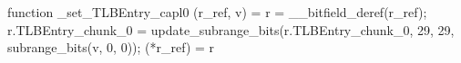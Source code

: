 function _set_TLBEntry_capl0 (r_ref, v) = {
    r = __bitfield_deref(r_ref);
    r.TLBEntry_chunk_0 = update_subrange_bits(r.TLBEntry_chunk_0, 29, 29, subrange_bits(v, 0, 0));
    (*r_ref) = r
}
